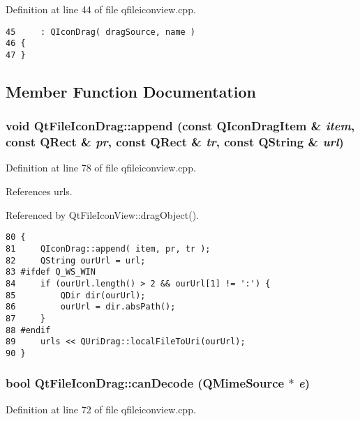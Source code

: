 Definition at line 44 of file qfileiconview.cpp.



\footnotesize\begin{verbatim}45     : QIconDrag( dragSource, name )
46 {
47 }
\end{verbatim}\normalsize 


\subsection{Member Function Documentation}
\subsubsection{\setlength{\rightskip}{0pt plus 5cm}void Qt\-File\-Icon\-Drag::append (const QIcon\-Drag\-Item \& {\em item}, const QRect \& {\em pr}, const QRect \& {\em tr}, const QString \& {\em url})}\label{classQtFileIconDrag_QtFileIconDraga3}




Definition at line 78 of file qfileiconview.cpp.

References urls.

Referenced by Qt\-File\-Icon\-View::drag\-Object().



\footnotesize\begin{verbatim}80 {
81     QIconDrag::append( item, pr, tr );
82     QString ourUrl = url;    
83 #ifdef Q_WS_WIN
84     if (ourUrl.length() > 2 && ourUrl[1] != ':') {
85         QDir dir(ourUrl);
86         ourUrl = dir.absPath();
87     }
88 #endif
89     urls << QUriDrag::localFileToUri(ourUrl);
90 }
\end{verbatim}\normalsize 
{}
\subsubsection{\setlength{\rightskip}{0pt plus 5cm}bool Qt\-File\-Icon\-Drag::can\-Decode (QMime\-Source $\ast$ {\em e})\hspace{0.3cm}{\tt  [static]}}\label{classQtFileIconDrag_QtFileIconDrage0}




Definition at line 72 of file qfileiconview.cpp.



